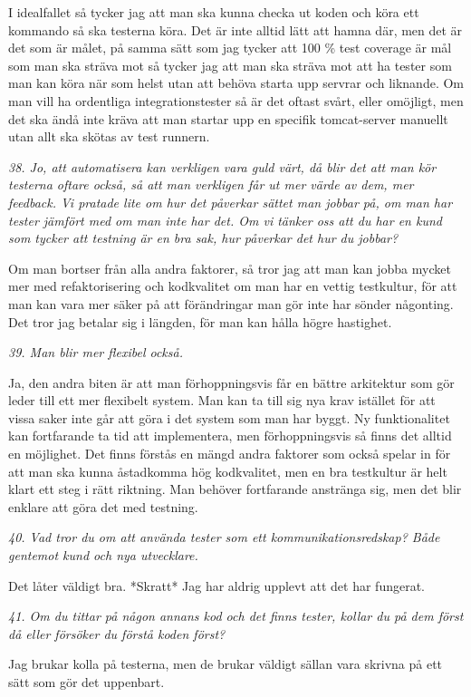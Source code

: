 \documentclass[11pt]{article}
\begin{document}
I idealfallet så tycker jag att man ska kunna checka ut koden och köra ett kommando så ska testerna köra. Det är inte alltid lätt att hamna där, men det är det som är målet, på samma sätt som jag tycker att 100 \% test coverage är mål som man ska sträva mot så tycker jag att man ska sträva mot att ha tester som man kan köra när som helst utan att behöva starta upp servrar och liknande. Om man vill ha ordentliga integrationstester så är det oftast svårt, eller omöjligt, men det ska ändå inte kräva att man startar upp en specifik tomcat-server manuellt utan allt ska skötas av test runnern.

\emph{38. Jo, att automatisera kan verkligen vara guld värt, då blir det att man kör testerna oftare också, så att man verkligen får ut mer värde av dem, mer feedback. Vi pratade lite om hur det påverkar sättet man jobbar på, om man har tester jämfört med om man inte har det. Om vi tänker oss att du har en kund som tycker att testning är en bra sak, hur påverkar det hur du jobbar?}

Om man bortser från alla andra faktorer, så tror jag att man kan jobba mycket mer med refaktorisering och kodkvalitet om man har en vettig testkultur, för att man kan vara mer säker på att förändringar man gör inte har sönder någonting. Det tror jag betalar sig i längden, för man kan hålla högre hastighet.

\emph{39. Man blir mer flexibel också.}

Ja, den andra biten är att man förhoppningsvis får en bättre arkitektur som gör leder till ett mer flexibelt system. Man kan ta till sig nya krav istället för att vissa saker inte går att göra i det system som man har byggt. Ny funktionalitet kan fortfarande ta tid att implementera, men förhoppningsvis så finns det alltid en möjlighet. Det finns förstås en mängd andra faktorer som också spelar in för att man ska kunna åstadkomma hög kodkvalitet, men en bra testkultur är helt klart ett steg i rätt riktning. Man behöver fortfarande anstränga sig, men det blir enklare att göra det med testning.

\emph{40. Vad tror du om att använda tester som ett kommunikationsredskap? Både gentemot kund och nya utvecklare.}

Det låter väldigt bra. *Skratt* Jag har aldrig upplevt att det har fungerat.

\emph{41. Om du tittar på någon annans kod och det finns tester, kollar du på dem först då eller försöker du förstå koden först?}

Jag brukar kolla på testerna, men de brukar väldigt sällan vara skrivna på ett sätt som gör det uppenbart.
\end{document}
